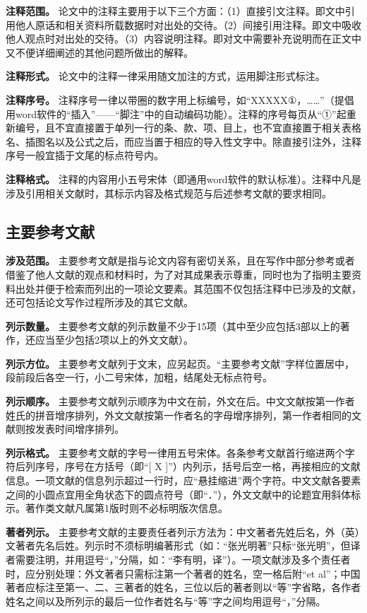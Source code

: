 \documentclass[singlesided]{Style/ucasthesis}%
\begin{document}
\textbf{注释范围。} 论文中的注释主要用于以下三个方面：（1）直接引文注释。即文中引用他人原话和相关资料所载数据时对出处的交待。（2）间接引用注释。即文中吸收他人观点时对出处的交待。（3）内容说明注释。即对文中需要补充说明而在正文中又不便详细阐述的其他问题所做出的解释。

\textbf{注释形式。} 论文中的注释一律采用随文加注的方式，运用脚注形式标注。

\textbf{注释序号。} 注释序号一律以带圈的数字用上标编号，如``XXXXX①，\ldots{}\ldots{}''（提倡用word软件的``插入''------``脚注''中的自动编码功能）。注释的序号每页从``①''起重新编号，且不宜直接置于单列一行的条、款、项、目上，也不宜直接置于相关表格名、插图名以及公式之后，而应当置于相应的导入性文字中。除直接引注外，注释序号一般宜插于文尾的标点符号内。

\textbf{注释格式。} 注释的内容用小五号宋体（即通用word软件的默认标准）。注释中凡是涉及引用相关文献时，其标示内容及格式规范与后述参考文献的要求相同。

\hypertarget{section-20}{%
\subsection{主要参考文献}\label{section-20}}

\textbf{涉及范围。} 主要参考文献是指与论文内容有密切关系，且在写作中部分参考或者借鉴了他人文献的观点和材料时，为了对其成果表示尊重，同时也为了指明主要资料出处并便于检索而列出的一项论文要素。其范围不仅包括注释中已涉及的文献，还可包括论文写作过程所涉及的其它文献。

\textbf{列示数量。} 主要参考文献的列示数量不少于15项（其中至少应包括3部以上的著作，还应当至少包括2项以上的外文文献）。

\textbf{列示方位。} 主要参考文献列于文末，应另起页。``主要参考文献''字样位置居中，段前段后各空一行，小二号宋体，加粗，结尾处无标点符号。

\textbf{列示顺序。} 主要参考文献列示顺序为中文在前，外文在后。中文文献按第一作者姓氏的拼音增序排列，外文文献按第一作者名的字母增序排列，第一作者相同的文献则按发表时间增序排列。

\textbf{列示格式。} 主要参考文献的字号一律用五号宋体。各条参考文献首行缩进两个字符后列序号，序号在方括号（即``{[} X {]}''）内列示，括号后空一格，再接相应的文献信息。一项文献的信息列示超过一行时，应``悬挂缩进''两个字符。中文文献各要素之间的小圆点宜用全角状态下的圆点符号（即``．''），外文文献中的论题宜用斜体标示。著作类文献凡属第1版时则不必标明版次信息。

\textbf{著者列示。} 主要参考文献的主要责任者列示方法为：中文著者先姓后名，外（英）文著者先名后姓。列示时不须标明编著形式（如：``张光明著''只标``张光明''，但译者需要注明，并用逗号``，''分隔，如：``李有明，译''）。一项文献涉及多个责任者时，应分别处理：外文著者只需标注第一个著者的姓名，空一格后附``et al''；中国著者应标注至第一、二、三著者的姓名，三位以后的著者则以``等''字省略，各作者姓名之间以及所列示的最后一位作者姓名与``等''字之间均用逗号``，''分隔。
\end{document}
